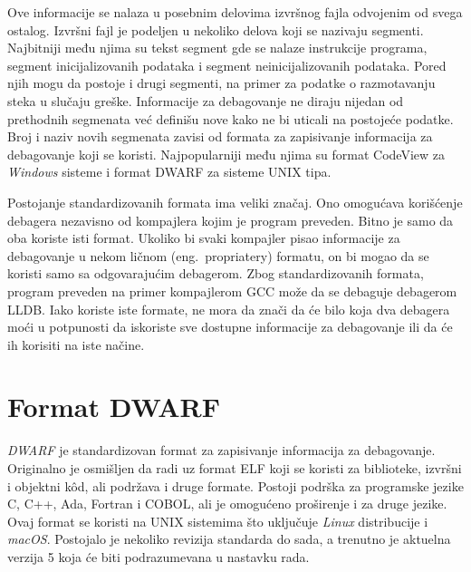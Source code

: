 \documentclass[12pt,oneside]{memoir}
\begin{document}
Ove informacije se nalaza u posebnim delovima izvršnog fajla odvojenim od svega ostalog.
Izvršni fajl je podeljen u nekoliko delova koji se nazivaju segmenti.
Najbitniji među njima su tekst segment gde se nalaze instrukcije programa, segment inicijalizovanih podataka i segment neinicijalizovanih podataka.
Pored njih mogu da postoje i drugi segmenti, na primer za podatke o razmotavanju steka u slučaju greške.
Informacije za debagovanje ne diraju nijedan od prethodnih segmenata već definišu nove kako ne bi uticali na postojeće podatke.
Broj i naziv novih segmenata zavisi od formata za zapisivanje informacija za debagovanje koji se koristi.
Najpopularniji među njima su format CodeView za \textit{Windows} sisteme i format DWARF za sisteme UNIX tipa.

Postojanje standardizovanih formata ima veliki značaj.
Ono omogućava korišćenje debagera nezavisno od kompajlera kojim je program preveden.
Bitno je samo da oba koriste isti format.
Ukoliko bi svaki kompajler pisao informacije za debagovanje u nekom ličnom (eng.~{propriatery}) formatu, on bi mogao da se koristi samo sa odgovarajućim debagerom.
Zbog standardizovanih formata, program preveden na primer kompajlerom GCC može da se debaguje debagerom LLDB.
Iako koriste iste formate, ne mora da znači da će bilo koja dva debagera moći u potpunosti da iskoriste sve dostupne informacije za debagovanje ili da će ih korisiti na iste načine.

\section{Format DWARF}
\label{sec:dwarf}


\textit{DWARF} je standardizovan \cite{dwarf5} format za zapisivanje informacija za debagovanje.
Originalno je osmišljen da radi uz format ELF \cite{elf} koji se koristi za biblioteke, izvršni i objektni k\^od, ali podržava i druge formate.
Postoji podrška za programske jezike C, C++, Ada, Fortran i COBOL, ali je omogućeno proširenje i za druge jezike.
Ovaj format se koristi na UNIX sistemima što uključuje \textit{Linux} distribucije i \textit{macOS}.
Postojalo je nekoliko revizija standarda do sada, a trenutno je aktuelna verzija 5 koja će biti podrazumevana u nastavku rada.
\end{document}
